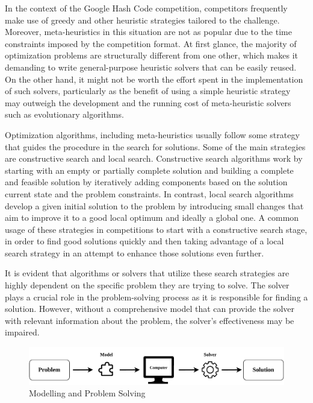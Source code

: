 In the context of the Google Hash Code competition, competitors frequently make
use of greedy and other heuristic strategies tailored to the challenge. Moreover,
meta-heuristics in this situation are not as popular due to the time constraints
imposed by the competition format. At first glance, the majority of
optimization problems are structurally different from one other, which makes it
demanding to write general-purpose heuristic solvers that can be easily reused.
On the other hand, it might not be worth the effort spent in the implementation
of such solvers, particularly as the benefit of using a simple heuristic
strategy may outweigh the development and the running cost of meta-heuristic
solvers such as evolutionary algorithms.

Optimization algorithms, including meta-heuristics usually follow some strategy
that guides the procedure in the search for solutions. Some of the main
strategies are constructive search and local search. Constructive search
algorithms work by starting with an empty or partially complete solution  and
building a complete and feasible solution by iteratively adding components
based on the solution current state and the problem constraints. In contrast,
local search algorithms develop a given initial solution to the problem by
introducing small changes that aim to improve it to a good local optimum and
ideally a global one. A common usage of these strategies in competitions to
start with a constructive search stage, in order to find good solutions quickly
and then taking advantage of a local search strategy in an attempt to enhance
those solutions even further.

It is evident that algorithms or solvers that utilize these search strategies
are highly dependent on the specific problem they are trying to solve. The
solver plays a crucial role in the problem-solving process as it is responsible
for finding a solution. However, without a comprehensive model that can provide
the solver with relevant information about the problem, the solver's
effectiveness may be impaired.

\begin{figure}[h]
      \centering
      \includegraphics[width=\textwidth,keepaspectratio]{../assets/modelling/modelling.pdf}
      \caption{Modelling and Problem Solving}
      \label{fig:problem-solving}
\end{figure}

